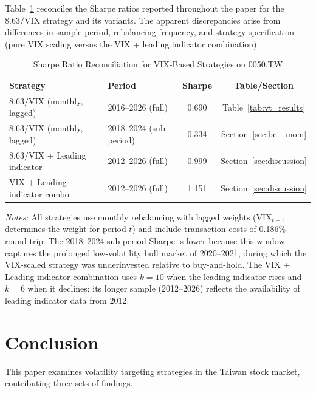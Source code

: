 Table~\ref{tab:sharpe_reconciliation} reconciles the Sharpe ratios reported throughout the paper for the $8.63/\text{VIX}$ strategy and its variants. The apparent discrepancies arise from differences in sample period, rebalancing frequency, and strategy specification (pure VIX scaling versus the VIX + leading indicator combination).

\begin{table}[H]
\centering
\caption{Sharpe Ratio Reconciliation for VIX-Based Strategies on 0050.TW}
\label{tab:sharpe_reconciliation}
\begin{tabular}{llcc}
\toprule
Strategy & Period & Sharpe & Table/Section \\
\midrule
$8.63/\text{VIX}$ (monthly, lagged) & 2016--2026 (full) & 0.690 & Table~\ref{tab:vt_results} \\
$8.63/\text{VIX}$ (monthly, lagged) & 2018--2024 (sub-period) & 0.334 & Section~\ref{sec:bci_mom} \\
$8.63/\text{VIX}$ + Leading indicator & 2012--2026 (full) & 0.999 & Section~\ref{sec:discussion} \\
VIX + Leading indicator combo & 2012--2026 (full) & 1.151 & Section~\ref{sec:discussion} \\
\bottomrule
\end{tabular}
\begin{flushleft}
\small \textit{Notes:} All strategies use monthly rebalancing with lagged weights (VIX$_{t-1}$ determines the weight for period $t$) and include transaction costs of 0.186\% round-trip. The 2018--2024 sub-period Sharpe is lower because this window captures the prolonged low-volatility bull market of 2020--2021, during which the VIX-scaled strategy was underinvested relative to buy-and-hold. The VIX + Leading indicator combination uses $k = 10$ when the leading indicator rises and $k = 6$ when it declines; its longer sample (2012--2026) reflects the availability of leading indicator data from 2012.
\end{flushleft}
\end{table}


\section{Conclusion}
\label{sec:conclusion}

This paper examines volatility targeting strategies in the Taiwan stock market, contributing three sets of findings.

